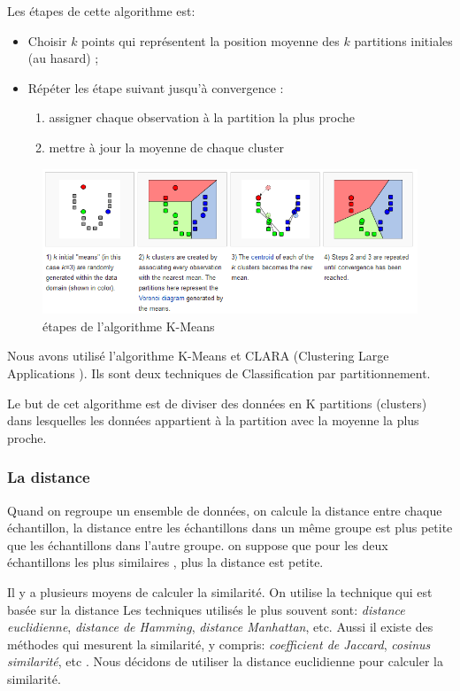 Les étapes de cette algorithme est:
\begin{itemize}
\item Choisir $k$ points qui représentent la position moyenne des $k$ partitions initiales (au hasard) ;
\item Répéter les étape suivant jusqu'à convergence :
\begin{enumerate}
\item assigner chaque observation à la partition la plus proche
\item mettre à jour la moyenne de chaque cluster
\end{enumerate}
\end{itemize}
\begin{figure}[H]
\centering
\includegraphics[width=0.7\linewidth]{images/kmeans}
\caption{étapes de l'algorithme K-Means}
\label{fig:kmeans}
\end{figure}

Nous avons utilisé l'algorithme K-Means et CLARA (Clustering Large Applications ). Ils sont deux techniques de Classification par partitionnement.

Le but de cet algorithme est de diviser des données en K partitions (clusters) dans lesquelles les données appartient à la partition avec la moyenne la plus proche. 

\subsubsection{La distance}

Quand on regroupe un ensemble de données, on calcule la distance entre chaque échantillon, la distance entre les échantillons dans un même groupe est plus petite que les échantillons dans l'autre groupe. on suppose que pour les deux échantillons les plus similaires , plus la distance est petite.


Il y a plusieurs moyens de calculer la similarité. On utilise la technique qui est basée sur la distance Les techniques utilisés le plus souvent sont: \emph{distance euclidienne}, \emph{distance de Hamming}, \emph{distance Manhattan}, etc. Aussi il existe des méthodes qui mesurent la similarité, y compris: \emph{coefficient de Jaccard}, \emph{cosinus similarité}, etc . Nous décidons de utiliser la distance euclidienne pour calculer la similarité.

